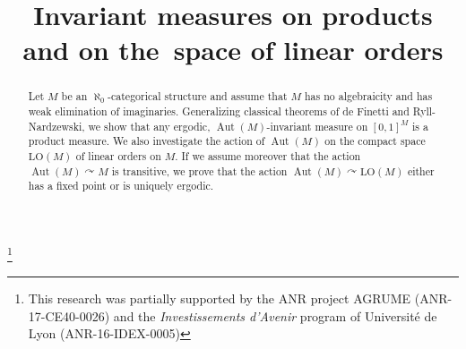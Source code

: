 \documentclass[JEP,XML,SOM,Unicode,published]{cedram}
\theoremstyle{plain}
\theoremstyle{definition}
\begin{document}
\frontmatter

\title[Invariant measures on products and on LO]{Invariant measures on products and on the~space of linear orders}

\author[\initial{C.} \lastname{Jahel}]{ }
\address{Institut Camille Jordan, Université Claude Bernard Lyon 1 \\
Université de Lyon\\
43, boulevard du 11 novembre 1918, 69622 Villeurbanne cedex, France}

\author[\initial{T.} \lastname{Tsankov}]{ }
\address{Institut Camille Jordan, Université Claude Bernard Lyon 1 \\
Université de Lyon\\
43, boulevard du 11 novembre 1918, 69622 Villeurbanne cedex, France\\
and Institut Universitaire de France}

\thanks{This research was partially supported by the ANR project AGRUME (ANR-17-CE40-0026) and the \emph{Investissements d'Avenir} program of Université de Lyon (ANR-16-IDEX-0005)}



\begin{abstract}
Let $M$ be an $\aleph_0$-categorical structure and assume that $M$ has no algebraicity and has weak elimination of imaginaries. Generalizing classical theorems of de Finetti and Ryll-Nardzewski, we show that any ergodic, $\operatorname{Aut}(M)$-invariant measure on $[0, 1]^M$ is a product measure. We also investigate the action of $\operatorname{Aut}(M)$ on the compact space $\mathrm{LO}(M)$ of linear orders on $M$. If we assume moreover that the action $\operatorname{Aut}(M) \curvearrowright M$ is transitive, we prove that the action $\operatorname{Aut}(M) \curvearrowright \mathrm{LO}(M)$ either has a fixed point or is uniquely ergodic.
\end{abstract}


\end{document}
